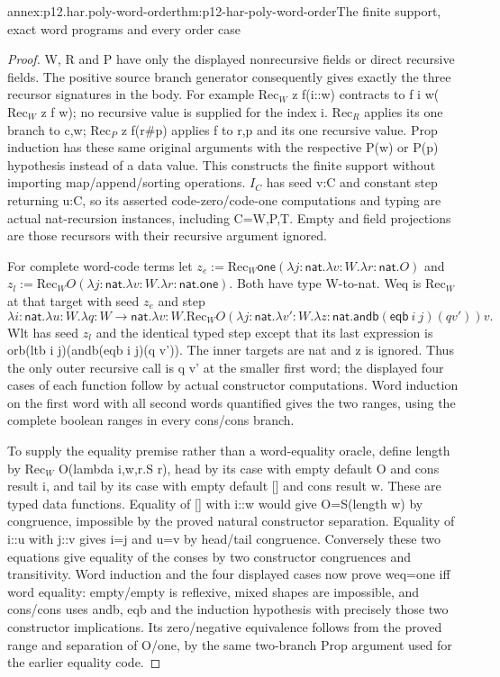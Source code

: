\begin{annexitem}{annex:p12.har.poly-word-order}{thm:p12-har-poly-word-order}{The finite support, exact word programs and every order case}
\begin{proof}
W, R and P have only the displayed nonrecursive fields or direct
recursive fields. The positive source branch generator consequently
gives exactly the three recursor signatures in the body. For example
\(\mathrm{Rec}_W\) z f(i::w) contracts to f i w(\(\mathrm{Rec}_W\) z f w); no recursive
value is supplied for the index i. \(\mathrm{Rec}_R\) applies its one branch to
c,w; \(\mathrm{Rec}_P\) z f(r\#p) applies f to r,p and its one recursive value.
Prop induction has these same original arguments with the respective
P(w) or P(p) hypothesis instead of a data value. This constructs
the finite support without importing map/append/sorting operations.
\(I_C\) has seed v:C and constant step returning u:C, so its asserted
code-zero/code-one computations and typing are actual nat-recursion
instances, including C=W,P,T. Empty and field projections are those
recursors with their recursive argument ignored.

For complete word-code terms let
\(z_e:=\mathrm{Rec}_W\mathsf{one}(\lambda j:\mathsf{nat}.
\lambda v:W.\lambda r:\mathsf{nat}.O)\) and
\(z_l:=\mathrm{Rec}_W O(\lambda j:\mathsf{nat}.
\lambda v:W.\lambda r:\mathsf{nat}.\mathsf{one})\).
Both have type W-to-nat. Weq is \(\mathrm{Rec}_W\) at that target with seed \(z_e\)
and step
\[
 \lambda i:\mathsf{nat}.\lambda u:W.\lambda q:W\to\mathsf{nat}.
 \lambda v:W.\mathrm{Rec}_W O
  (\lambda j:\mathsf{nat}.\lambda v':W.\lambda z:\mathsf{nat}.
       \mathsf{andb}(\mathsf{eqb}\ i\ j)(q v'))v.
\]
Wlt has seed \(z_l\) and the identical typed step except that its last
expression is orb(ltb i j)(andb(eqb i j)(q v')). The inner targets
are nat and z is ignored. Thus the only outer recursive call is q v'
at the smaller first word; the displayed four cases of each function
follow by actual constructor computations. Word induction on the first
word with all second words quantified gives the two ranges, using
the complete boolean ranges in every cons/cons branch.

To supply the equality premise rather than a word-equality oracle,
define length by \(\mathrm{Rec}_W\) O(lambda i,w,r.S r), head by its case with
empty default O and cons result i, and tail by its case with empty
default [] and cons result w. These are typed data functions. Equality
of [] with i::w would give O=S(length w) by congruence, impossible
by the proved natural constructor separation. Equality of i::u with
j::v gives i=j and u=v by head/tail congruence. Conversely these
two equations give equality of the conses by two constructor congruences
and transitivity. Word induction and the four displayed cases now prove
weq=one iff word equality: empty/empty is reflexive, mixed shapes are
impossible, and cons/cons uses andb, eqb and the induction hypothesis
with precisely those two constructor implications. Its zero/negative
equivalence follows from the proved range and separation of O/one,
by the same two-branch Prop argument used for the earlier equality code.


\end{proof}
\end{annexitem}
